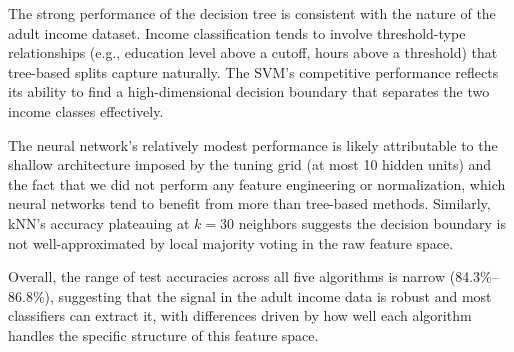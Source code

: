 \documentclass{article}
\begin{document}
The strong performance of the decision tree is consistent with the nature of the adult income dataset. Income classification tends to involve threshold-type relationships (e.g., education level above a cutoff, hours above a threshold) that tree-based splits capture naturally. The SVM's competitive performance reflects its ability to find a high-dimensional decision boundary that separates the two income classes effectively.

The neural network's relatively modest performance is likely attributable to the shallow architecture imposed by the tuning grid (at most 10 hidden units) and the fact that we did not perform any feature engineering or normalization, which neural networks tend to benefit from more than tree-based methods. Similarly, kNN's accuracy plateauing at $k=30$ neighbors suggests the decision boundary is not well-approximated by local majority voting in the raw feature space.

Overall, the range of test accuracies across all five algorithms is narrow (84.3\%--86.8\%), suggesting that the signal in the adult income data is robust and most classifiers can extract it, with differences driven by how well each algorithm handles the specific structure of this feature space.
\end{document}
